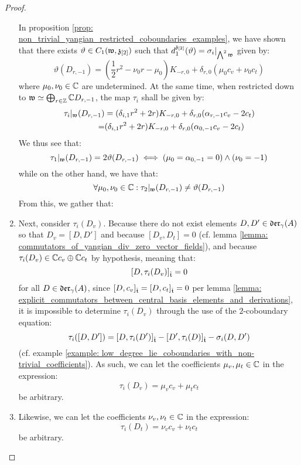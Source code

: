 \begin{proof}
\begin{enumerate}
                    In proposition \ref{prop: non_trivial_yangian_restricted_coboundaries_examples}, we have shown that there exists $\vartheta \in C_1(\mathfrak{w}, \mathfrak{z}_{[2]})$ such that $d_1^{\mathfrak{z}_{[2]}}(\vartheta) = \sigma_i|_{\bigwedge^2 \mathfrak{w}}$ given by:
                        $$\vartheta( D_{r, -1} ) = \left( \frac12 r^2 - \nu_0 r - \mu_0 \right) K_{-r, 0} + \delta_{r, 0} ( \mu_0 c_v + \nu_0 c_t )$$
                    where $\mu_0, \nu_0 \in \mathbb{C}$ are undetermined. At the same time, when restricted down to $\mathfrak{w} \simeq \bigoplus_{r \in \mathbb{Z}} \mathbb{C} D_{r, -1}$, the map $\tau_i$ shall be given by:
                        $$
                            \begin{aligned}
                                \tau_i|_{\mathfrak{w}}(D_{r, -1}) & = ( \delta_{i, 1} r^2 + 2r ) K_{-r, 0} + \delta_{r, 0} ( \alpha_{r, -1} c_v - 2 c_t )
                                \\
                                = & ( \delta_{i, 1} r^2 + 2r ) K_{-r, 0} + \delta_{r, 0} ( \alpha_{0, -1} c_v - 2 c_t )
                            \end{aligned}
                        $$
                    We thus see that:
                        $$\tau_1|_{\mathfrak{w}}(D_{r, -1}) = 2\vartheta(D_{r, -1}) \iff (\mu_0 = \alpha_{0, -1} = 0) \wedge (\nu_0 = -1)$$
                    while on the other hand, we have that:
                        $$\forall \mu_0, \nu_0 \in \mathbb{C}: \tau_2|_{\mathfrak{w}}(D_{r, -1}) \not = \vartheta(D_{r, -1})$$
                    From this, we gather that:
                        
                    \item Next, consider $\tau_i(D_v)$. Because there do not exist elements $D, D' \in \mathfrak{der}_{\gamma}(A)$ so that $D_v = [D, D']$ and because $[D_v, D_t] = 0$ (cf. lemma \ref{lemma: commutators_of_yangian_div_zero_vector_fields}), and because $\tau_i(D_v) \in \mathbb{C} c_v \oplus \mathbb{C} c_t$ by hypothesis, meaning that:
                        $$[D, \tau_i(D_v)]_{\hat{\mathfrak{t}}} = 0$$
                    for all $D \in \mathfrak{der}_{\gamma}(A)$, since $[D, c_v]_{\hat{\mathfrak{t}}} = [D, c_t]_{\hat{\mathfrak{t}}} = 0$ per lemma \ref{lemma: explicit_commutators_between_central_basis_elements_and_derivations}, it is impossible to determine $\tau_i(D_v)$ through the use of the $2$-coboundary equation:
                        $$\tau_i([D, D']) = [D, \tau_i(D')]_{\hat{\mathfrak{t}}} - [D', \tau_i(D)]_{\hat{\mathfrak{t}}} - \sigma_i(D, D')$$
                    (cf. example \ref{example: low_degree_lie_coboundaries_with_non-trivial_coefficients}). As such, we can let the coefficients $\mu_v, \mu_t \in \mathbb{C}$ in the expression:
                        $$\tau_i(D_v) = \mu_v c_v + \mu_t c_t$$
                    be arbitrary.
                    \item Likewise, we can let the coefficients $\nu_v, \nu_t \in \mathbb{C}$ in the expression:
                        $$\tau_i(D_t) = \nu_v c_v + \nu_t c_t$$
                    be arbitrary.
                \end{enumerate}
            \end{proof}
